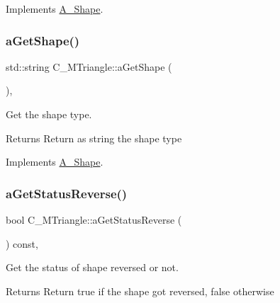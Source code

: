 Implements \hyperlink{classA__Shape_a9fd1285bd63b1fc88943c9969bf01a5c}{A\+\_\+\+Shape}.

\mbox{\label{classC__MTriangle_aca7e38c6bf9695aacf54aa03ecfba978}} 
\subsubsection{\texorpdfstring{a\+Get\+Shape()}{aGetShape()}}
{\footnotesize\ttfamily std\+::string C\+\_\+\+M\+Triangle\+::a\+Get\+Shape (\begin{DoxyParamCaption}{ }\end{DoxyParamCaption})\hspace{0.3cm}{\ttfamily [override]}, {\ttfamily [virtual]}}



Get the shape type. 

\begin{DoxyReturn}{Returns}
Return as string the shape type 
\end{DoxyReturn}


Implements \hyperlink{classA__Shape_a1b202256a4e5dcb0edab4ab93a37122c}{A\+\_\+\+Shape}.

\mbox{\label{classC__MTriangle_a5c0488c23e9e64750bb879d0394830b2}} 
\subsubsection{\texorpdfstring{a\+Get\+Status\+Reverse()}{aGetStatusReverse()}}
{\footnotesize\ttfamily bool C\+\_\+\+M\+Triangle\+::a\+Get\+Status\+Reverse (\begin{DoxyParamCaption}{ }\end{DoxyParamCaption}) const\hspace{0.3cm}{\ttfamily [override]}, {\ttfamily [virtual]}}



Get the status of shape reversed or not. 

\begin{DoxyReturn}{Returns}
Return true if the shape got reversed, false otherwise 
\end{DoxyReturn}


